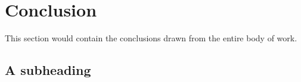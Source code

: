 \center

\section{Conclusion}

\raggedright

This section would contain the conclusions drawn from the entire body of work.

\subsection{A subheading}
\lipsum
